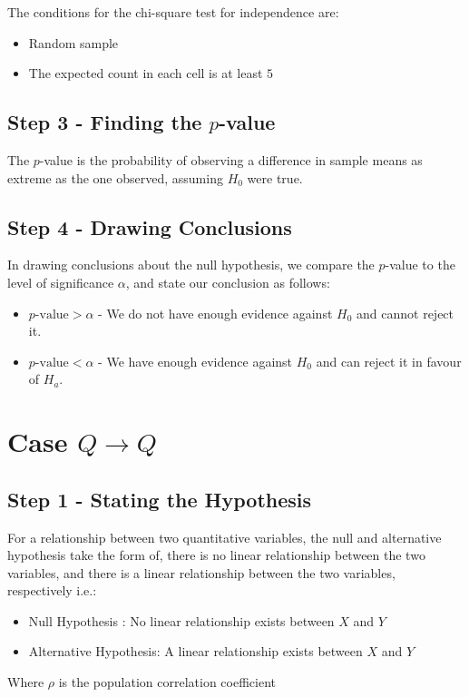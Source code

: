 \documentclass[12pt letter]{report}
\begin{document}
The conditions for the chi-square test for independence are:
\begin{itemize}
  \item Random sample
  \item The expected count in each cell is at least $5$
\end{itemize}

\subsection{Step 3 - Finding the $p$-value}

The $p$-value is the probability of observing a difference in sample means as extreme as the one observed, assuming
$H_0$ were true.

\subsection{Step 4 - Drawing Conclusions}

In drawing conclusions about the null hypothesis, we compare the $p$-value to the level of significance $\alpha $,
and state our conclusion as follows:
\begin{itemize}
  \item $p\text{-value} > \alpha$ - We do not have enough evidence against $H_0$ and cannot reject it.
  \item $p\text{-value} < \alpha$ - We have enough evidence against $H_0$ and can reject it in favour of $H_a$.
\end{itemize}

\section{Case $Q \to Q$}

\subsection{Step 1 - Stating the Hypothesis}

For a relationship between two quantitative variables, the null and alternative hypothesis take the form of, there is no
linear relationship between the two variables, and there is a linear relationship between the two variables, respectively i.e.:
\begin{itemize}
  \item Null Hypothesis : No linear relationship exists between $X$ and $Y$
  \item Alternative Hypothesis: A linear relationship exists between $X$ and $Y$
\end{itemize}
Where $\rho $ is the population correlation coefficient
\end{document}
